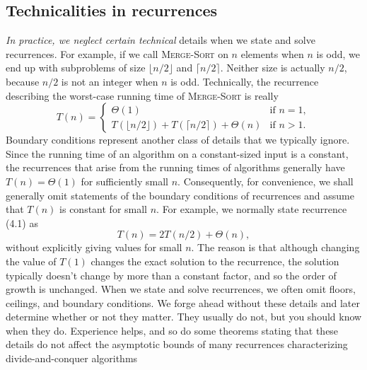 \documentclass{report}
\begin{document}
        \subsection{Technicalities in recurrences}
        \bigbreak \noindent 
        \textit{In practice, we neglect certain technical} details when we state and solve recurrences. For example, if we call \textsc{Merge-Sort} on \( n \) elements when \( n \) is odd, we end up with subproblems of size \( \lfloor n/2 \rfloor \) and \( \lceil n/2 \rceil \). Neither size is actually \( n/2 \), because \( n/2 \) is not an integer when \( n \) is odd. Technically, the recurrence describing the worst-case running time of \textsc{Merge-Sort} is really
        \[
            T(n) =
            \begin{cases} 
                \Theta(1) & \text{if } n = 1, \\
                T(\lfloor n/2 \rfloor) + T(\lceil n/2 \rceil) + \Theta(n) & \text{if } n > 1 .
            \end{cases} \tag{4.3}
        \]
        Boundary conditions represent another class of details that we typically ignore. Since the running time of an algorithm on a constant-sized input is a constant, the recurrences that arise from the running times of algorithms generally have \( T(n) = \Theta(1) \) for sufficiently small \( n \). Consequently, for convenience, we shall generally omit statements of the boundary conditions of recurrences and assume that \( T(n) \) is constant for small \( n \). For example, we normally state recurrence (4.1) as
        \[
            T(n) = 2T(n/2) + \Theta(n) , \tag{4.4}
        \]
        without explicitly giving values for small \( n \). The reason is that although changing the value of \( T(1) \) changes the exact solution to the recurrence, the solution typically doesn’t change by more than a constant factor, and so the order of growth is unchanged.
        \bigbreak \noindent 
        When we state and solve recurrences, we often omit floors, ceilings, and boundary conditions. We forge ahead without these details and later determine whether or not they matter. They usually do not, but you should know when they do. Experience helps, and so do some theorems stating that these details do not affect the asymptotic bounds of many recurrences characterizing divide-and-conquer algorithms 

        \pagebreak 
\end{document}
